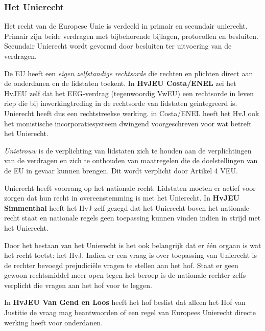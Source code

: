 \documentclass{article}
\begin{document}
\subsubsection{Het Unierecht}

Het recht van de Europese Unie is verdeeld in primair en secundair unierecht.
Primair zijn beide verdragen met bijbehorende bijlagen, protocollen en
besluiten. Secundair Unierecht wordt gevormd door besluiten ter uitvoering van
de verdragen.

De EU heeft een \emph{eigen zelfstandige rechtsorde} die rechten en plichten
direct aan de onderdanen en de lidstaten toekent. In \textbf{HvJEU Costa/ENEL}
zei het HvJEU zelf dat het EEG-verdrag (tegenwoordig VwEU) een rechtsorde in
leven riep die bij inwerkingtreding in de rechtsorde van lidstaten geintegreerd
is. Unierecht heeft dus een rechtstreekse werking. in Costa/ENEL heeft het HvJ
ook het monistische incorporatiesysteem dwingend voorgeschreven voor wat
betreft het Unierecht.

\emph{Unietrouw} is de verplichting van lidstaten zich te houden aan de
verplichtingen van de verdragen en zich te onthouden van maatregelen die de
doelstellingen van de EU in gevaar kunnen brengen. Dit wordt verplicht door
Artikel 4 VEU.

Unierecht heeft voorrang op het nationale recht. Lidstaten moeten er actief
voor zorgen dat hun recht in overeenstemming is met het Unierecht. In
\textbf{HvJEU Simmenthal} heeft het HvJ zelf gezegd dat het Unierecht boven het
nationale recht staat en nationale regels geen toepassing kunnen vinden indien
in strijd met het Unierecht.

Door het bestaan van het Unierecht is het ook belangrijk dat er \'e\'en orgaan
is wat het recht toetst: het HvJ. Indien er een vraag is over toepassing van
Unierecht is de rechter bevoegd prejudici\"ele vragen te stellen aan het hof.
Staat er geen gewoon rechtsmiddel meer open tegen het beroep is de nationale
rechter zelfs verplicht die vragen aan het hof voor te leggen.

In \textbf{HvJEU Van Gend en Loos} heeft het hof beslist dat alleen het Hof
van Justitie de vraag mag beantwoorden of een regel van Europees Unierecht
directe werking heeft voor onderdanen.
\end{document}
